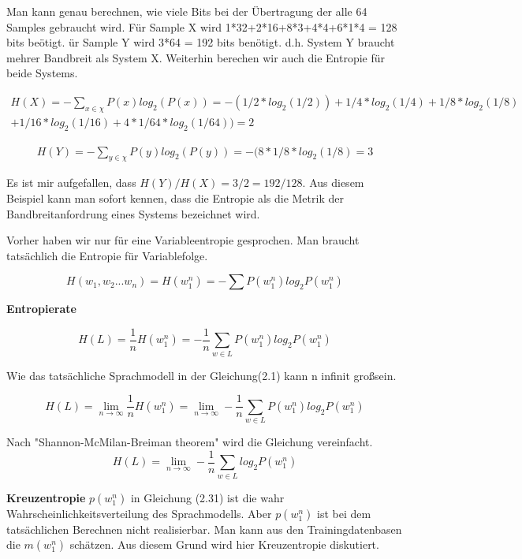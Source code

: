 Man kann genau berechnen, wie viele Bits bei der \"Ubertragung der alle 64 Samples gebraucht wird. F\"ur Sample X wird 1*32+2*16+8*3+4*4+6*1*4 = 128 bits be\"otigt. \"ur Sample Y wird 3*64 = 192 bits ben\"otigt. d.h. System Y braucht mehrer Bandbreit als System X. Weiterhin berechen wir auch die Entropie f\"ur beide Systems.

\begin{multline}
H(X)=-\sum_{x\in\chi}P(x)log_{2}(P(x))=-(1/2*log_{2}(1/2))+1/4*log_{2}(1/4)+1/8*log_{2}(1/8)\\
+1/16*log_{2}(1/16)+4*1/64*log_{2}(1/64))=2
\end{multline}

\begin{multline}
H(Y)=-\sum_{y\in\chi}P(y)log_{2}(P(y))=-(8*1/8*log_{2}(1/8)=3
\end{multline}

Es ist mir aufgefallen, dass $H(Y)/H(X)=3/2=192/128$. Aus diesem Beispiel kann man sofort kennen, dass die Entropie als die Metrik der Bandbreitanfordrung eines Systems bezeichnet wird.
   
Vorher haben wir nur f\"ur eine Variableentropie gesprochen. Man braucht tats\"achlich die Entropie f\"ur Variablefolge.

\begin{equation}
H(w_{1},w_{2}...w_{n})=H(w_{1}^{n})=-\sum{P(w_{1}^{n})log_{2}P(w_{1}^{n})}
\end{equation}

\textbf{Entropierate}

\begin{equation}
H(L)=\frac{1}{n}H(w_{1}^{n})=-\frac{1}{n}\sum_{w\in L}P(w_{1}^{n})log_{2}P(w_{1}^{n})
\end{equation}

Wie das tats\"achliche Sprachmodell in der Gleichung(2.1) kann n infinit gro\ss sein.

\begin{equation}
H(L)=\lim_{n\to\infty}\frac{1}{n}H(w_{1}^{n})=\lim_{n\to\infty}-\frac{1}{n}\sum_{w\in L}P(w_{1}^{n})log_{2}P(w_{1}^{n})
\end{equation}

Nach "Shannon-McMilan-Breiman theorem" wird die Gleichung vereinfacht.
\begin{equation}
H(L)=\lim_{n\to\infty}-\frac{1}{n}\sum_{w\in L}log_{2}P(w_{1}^{n})
\end{equation}

\textbf{Kreuzentropie}
$p(w_{1}^{n})$ in Gleichung (2.31) ist die wahr Wahrscheinlichkeitsverteilung des Sprachmodells. Aber $p(w_{1}^{n})$ ist bei dem tats\"achlichen Berechnen nicht realisierbar. Man kann aus den Trainingdatenbasen die $m(w_{1}^{n})$ sch\"atzen. Aus diesem Grund  wird hier Kreuzentropie diskutiert.

